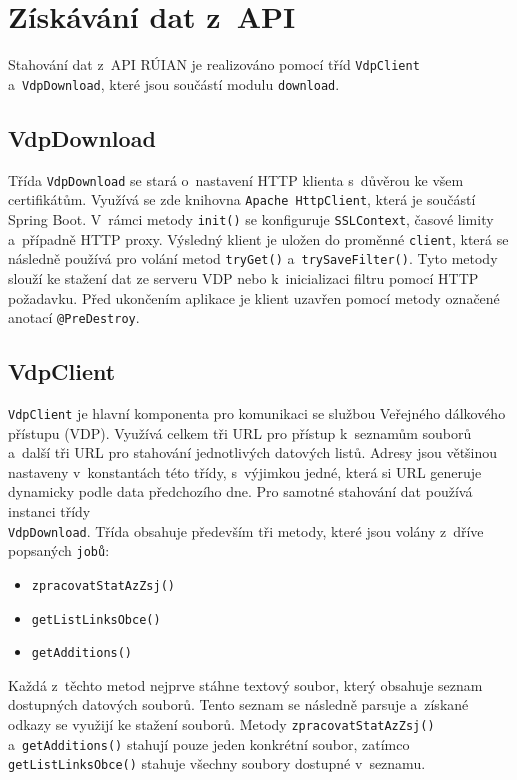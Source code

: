 \newpage

\section{Získávání dat z~API}
Stahování dat z~API RÚIAN je realizováno pomocí tříd \texttt{VdpClient} a~\texttt{VdpDownload},  
které jsou součástí modulu \texttt{download}.

\subsection*{VdpDownload}
Třída \texttt{VdpDownload} se stará o~nastavení HTTP klienta s~důvěrou ke všem certifikátům.  
Využívá se zde knihovna \texttt{Apache HttpClient}, která je součástí Spring Boot.  
V~rámci metody \texttt{init()} se konfiguruje \texttt{SSLContext}, časové limity a~případně HTTP proxy.  
Výsledný klient je uložen do proměnné \texttt{client}, která se následně používá pro volání metod \texttt{tryGet()} a~\texttt{trySaveFilter()}.  
Tyto metody slouží ke stažení dat ze serveru VDP nebo k~inicializaci filtru pomocí HTTP požadavku.  
Před ukončením aplikace je klient uzavřen pomocí metody označené anotací \texttt{@PreDestroy}.

\subsection*{VdpClient}
\texttt{VdpClient} je hlavní komponenta pro komunikaci se službou Veřejného dálkového přístupu (VDP).  
Využívá celkem tři URL pro přístup k~seznamům souborů a~další tři URL pro stahování jednotlivých datových listů.  
Adresy jsou většinou nastaveny v~konstantách této třídy, s~výjimkou jedné, která si URL generuje dynamicky podle data předchozího dne.  
Pro samotné stahování dat používá instanci třídy \\ \texttt{VdpDownload}.
Třída obsahuje především tři metody, které jsou volány z~dříve popsaných \texttt{jobů}:
\begin{itemize}[itemsep=0pt]
    \item \texttt{zpracovatStatAzZsj()}
    \item \texttt{getListLinksObce()}
    \item \texttt{getAdditions()}
\end{itemize}

Každá z~těchto metod nejprve stáhne textový soubor, který obsahuje seznam dostupných datových souborů.  
Tento seznam se následně parsuje a~získané odkazy se využijí ke stažení souborů.  
Metody \texttt{zpracovatStatAzZsj()} a~\texttt{getAdditions()} stahují pouze jeden konkrétní soubor,  
zatímco \texttt{getListLinksObce()} stahuje všechny soubory dostupné v~seznamu.

